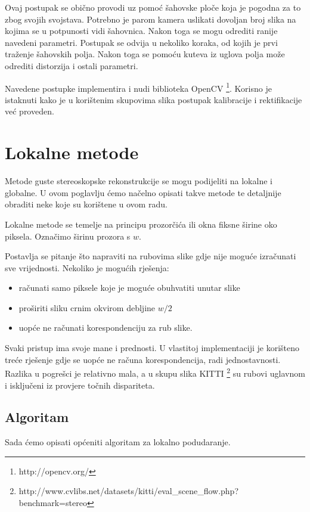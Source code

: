 \documentclass[utf8, zavrsni, numeric]{fer}
\begin{document}
Ovaj postupak se obično provodi uz pomoć šahovske ploče koja je pogodna za to zbog svojih svojstava. Potrebno je parom kamera uslikati dovoljan broj slika na kojima se u potpunosti vidi šahovnica.
Nakon toga se mogu odrediti ranije navedeni parametri. Postupak se odvija u nekoliko koraka, od kojih je prvi traženje šahovskih polja. Nakon toga se pomoću kuteva iz uglova polja može odrediti distorzija
i ostali parametri.

Navedene postupke implementira i nudi biblioteka OpenCV \footnote{http://opencv.org/}. Korisno je istaknuti kako je u korištenim skupovima slika postupak kalibracije i rektifikacije već proveden.


\chapter{Lokalne metode}
Metode guste stereoskopske rekonstrukcije se mogu podijeliti na lokalne i globalne. U ovom poglavlju ćemo načelno opisati takve metode te detaljnije obraditi neke koje su korištene u ovom radu.

Lokalne metode se temelje na principu prozorčića ili okna fiksne širine oko piksela. Označimo širinu prozora s $w$.

Postavlja se pitanje što napraviti na rubovima slike gdje nije moguće izračunati sve vrijednosti. Nekoliko je mogućih rješenja:
\begin{itemize}
  \item računati samo piksele koje je moguće obuhvatiti unutar slike
  \item proširiti sliku crnim okvirom debljine $w/2$
  \item uopće ne računati korespondenciju za rub slike.
\end{itemize}

Svaki pristup ima svoje mane i prednosti. U vlastitoj implementaciji je korišteno treće rješenje gdje se uopće ne računa korespondencija, radi jednostavnosti. Razlika u pogrešci je relativno
mala, a u skupu slika KITTI \footnote{http://www.cvlibs.net/datasets/kitti/eval\_scene\_flow.php?benchmark=stereo} su rubovi uglavnom i isključeni iz provjere točnih dispariteta.

\section{Algoritam}
Sada ćemo opisati općeniti algoritam za lokalno podudaranje.
\end{document}
